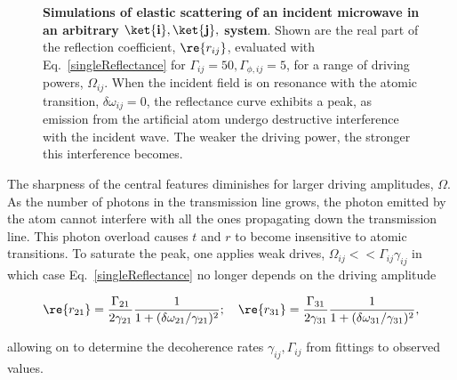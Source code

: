 \begin{figure}[h]
  \caption{\small  \textbf{Simulations  of  elastic  scattering  of  an  incident
      microwave in an arbitrary $ \mathbf{\ket{i}, \ket{j}}, $ system}. Shown are
    the real part of the reflection  coefficient, $ \re{r_{ij}} $, evaluated with
    Eq.~\eqref{singleReflectance} for $ \Gamma_{ij}=50, \Gamma_{\phi,ij}=5 $, for
    a range  of driving powers,  $ \Omega_{ij} $. When  the incident field  is on
    resonance  with   the  atomic   transition,  $  \delta\omega_{ij}=0   $,  the
    reflectance  curve exhibits  a peak,  as  emission from  the artificial  atom
    undergo  destructive interference  with  the incident  wave.  The weaker  the
    driving power, the stronger this interference becomes.}
  \label{singleDriveReflection}
\end{figure}

The sharpness of  the central features diminishes for  larger driving amplitudes,
$ \Omega $. As  the number of photons in the transmission  line grows, the photon
emitted  by the  atom cannot  interfere with  all the  ones propagating  down the
transmission  line. This  photon  overload causes  $  t $  and $  r  $ to  become
insensitive  to atomic  transitions.   To  saturate the  peak,  one applies  weak
drives,    $     \Omega_{ij}<<\Gamma_{ij}\gamma_{ij}    $    in     which    case
Eq.~\eqref{singleReflectance} no longer depends on the driving amplitude

\begin{equation}
  \begin{aligned}
    \re{r_{21}}                                                                 =
    \frac{\Gamma_{21}}{2\gamma_{21}}\frac{1}{1+(\delta\omega_{21}/\gamma_{21})^2};
    \quad
    \re{r_{31}}=\frac{\Gamma_{31}}{2\gamma_{31}}\frac{1}{1+(\delta\omega_{31}/\gamma_{31})^2},
  \end{aligned}
  \label{singleLorentzian}
\end{equation}

\noindent     allowing    on     to    determine     the    decoherence     rates
$ \gamma_{ij}, \Gamma_{ij} $ from fittings to observed values.



